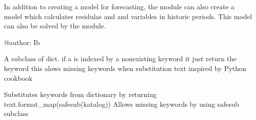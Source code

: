 \documentclass[letterpaper,10pt,english]{sphinxmanual}
\begin{document}
\sphinxAtStartPar
In addition to creating a model for forecasting, the module can also create a model which calculates residulas and and variables
in historic periods.  This model can also be solved by the  module.

\sphinxAtStartPar
@author: Ib

\begin{fulllineitems}
\label{\detokenize{index:modelmanipulation.safesub}}
\pysigstartsignatures
{}
\pysigstopsignatures
\sphinxAtStartPar
A subclass of dict.
if a  is indexed by a nonexisting keyword it just return the keyword
this alows missing keywords when substitution text inspired by Python cookbook

\end{fulllineitems}


\begin{fulllineitems}
\label{\detokenize{index:modelmanipulation.sub}}
\pysigstartsignatures
{}
\pysigstopsignatures
\sphinxAtStartPar
Substitutes keywords from dictionary by returning
text.format\_map(safesub(katalog))
Allows missing keywords by using safesub subclass

\end{fulllineitems}

\end{document}
